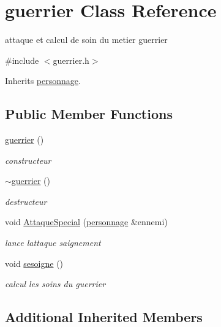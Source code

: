 \hypertarget{classguerrier}{}\section{guerrier Class Reference}
\label{classguerrier}


attaque et calcul de soin du metier guerrier  




{\ttfamily \#include $<$guerrier.\+h$>$}



Inherits \mbox{\hyperlink{classpersonnage}{personnage}}.

\subsection*{Public Member Functions}
\begin{DoxyCompactItemize}
\item 
\mbox{\hyperlink{classguerrier_ac9f4687d3fc741a5073144cc41ec3e2f}{guerrier}} ()
\begin{DoxyCompactList}\small\item\em constructeur \end{DoxyCompactList}\item 
\mbox{\hyperlink{classguerrier_a32b49d2dd369765e82d4877eb77307d7}{$\sim$guerrier}} ()
\begin{DoxyCompactList}\small\item\em destructeur \end{DoxyCompactList}\item 
void \mbox{\hyperlink{classguerrier_a45be17451300545249a90304dcd87fdc}{Attaque\+Special}} (\mbox{\hyperlink{classpersonnage}{personnage}} \&ennemi)
\begin{DoxyCompactList}\small\item\em lance l\textquotesingle{}attaque saignement \end{DoxyCompactList}\item 
void \mbox{\hyperlink{classguerrier_a6cd3c97454ef720925fcb7415739cd88}{sesoigne}} ()
\begin{DoxyCompactList}\small\item\em calcul les soins du guerrier \end{DoxyCompactList}\end{DoxyCompactItemize}
\subsection*{Additional Inherited Members}



